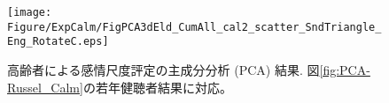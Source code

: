 

\begin{figure}[t] 
   \begin{center} 
     \hspace{-20pt}
         \texttt{[image: Figure/ExpCalm/FigPCA3dEld\_CumAll\_cal2\_scatter\_SndTriangle\_Eng\_RotateC.eps]}
        \vspace{-3pt}
         \caption{高齢者による感情尺度評定の主成分分析 (PCA) 結果. 図\ref{fig:PCA-Russel_Calm}の若年健聴者結果に対応。}
          \label{fig:PCA_Eld}
     \end{center}  
 \end{figure}





